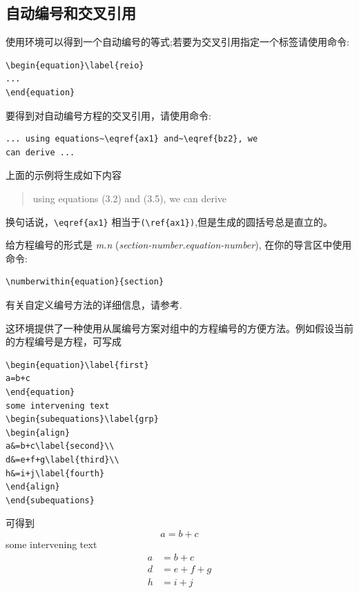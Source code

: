 \subsection{自动编号和交叉引用}
使用环境可以得到一个自动编号的等式;若要为交叉引用指定一个标签请使用命令:
\begin{verbatim}
\begin{equation}\label{reio}
...
\end{equation}
\end{verbatim}
要得到对自动编号方程的交叉引用，请使用命令:
\begin{verbatim}
... using equations~\eqref{ax1} and~\eqref{bz2}, we
can derive ...
\end{verbatim}
上面的示例将生成如下内容
\begin{quote}
  using equations (3.2) and (3.5), we can derive
\end{quote}
换句话说，\verb'\eqref{ax1}' 相当于\verb'(\ref{ax1})',但是生成的圆括号总是直立的。

给方程编号的形式是 \textit{m.n} (\textit{section-number.equation-number}),
在你的导言区中使用命令:
\begin{verbatim}
\numberwithin{equation}{section}
\end{verbatim}

有关自定义编号方法的详细信息，请参考\cite[\S 6.3,
\S C.8.4]{lamport}.

这环境提供了一种使用从属编号方案对组中的方程编号的方便方法。例如假设当前的方程编号是方程，可写成
\begin{verbatim}
\begin{equation}\label{first}
a=b+c
\end{equation}
some intervening text
\begin{subequations}\label{grp}
\begin{align}
a&=b+c\label{second}\\
d&=e+f+g\label{third}\\
h&=i+j\label{fourth}
\end{align}
\end{subequations}
\end{verbatim}
可得到
\begin{equation}\label{first}
a=b+c
\end{equation}
some intervening text
\begin{subequations}\label{grp}
\begin{align}
a&=b+c\label{second}\\
d&=e+f+g\label{third}\\
h&=i+j\label{fourth}
\end{align}
\end{subequations}

